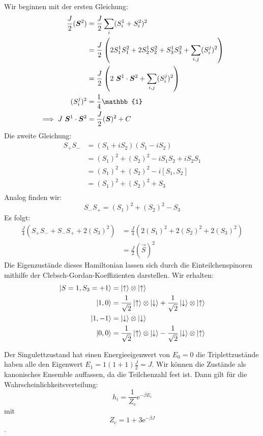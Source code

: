 Wir beginnen mit der ersten Gleichung:
\begin{align*}
\frac{J}{2}(\vec{S}^2) &= \frac{J}{2} \sum_i (S^1_i + S^2_i)^2 \\
&= \frac{J}{2} \del{2S^1_1S^2_1+2S^1_2S^2_2+S^1_3S^2_3 + \sum_{i,j} (S^j_i)^2} \\
&= \frac{J}{2} \del{2 \ \vec{S}^1 \cdot \vec{S}^2 + \sum_{i,j} (S^j_i)^2}  \\
(S^j_i)^2 &= \frac{1}{4} \mathbb{1} \\
\implies J \ \vec{S}^1 \cdot \vec{S}^2 &= \frac{J}{2}(\vec{S})^2 + C
\end{align*}
Die zweite Gleichung:
\begin{align*}
S_+S_- &= (S_1 + iS_2)(S_1 - iS_2)  \\
&= (S_1)^2 + (S_2)^2 - iS_1S_2 + iS_2S_1 \\
&= (S_1)^2 + (S_2)^2 - i[S_1,S_2] \\
&= (S_1)^2 + (S_2)^2 + S_3 \\
\end{align*}
Analog finden wir: 
\[ S_-S_+ = (S_1)^2 + (S_2)^2 - S_3 \]
Es folgt:
\begin{align*}
\frac{J}{4}(S_+S_-+S_-S_++2(S_3)^2) &= \frac{J}{4}(2(S_1)^2+2(S_2)^2+2(S_3)^2) \\
&= \frac{J}{2}(\vec{S})^2
\end{align*}
Die Eigenzustände dieses Hamiltonian lassen sich durch die Einteilchenspinoren mithilfe der Clebsch-Gordan-Koeffizienten darstellen. Wir erhalten:
\begin{align*}
\ket{S=1, S_3=+1} &= \ket{\uparrow} \otimes \ket{\uparrow} \\
\ket{1,0} &= \frac{1}{\sqrt{2}}\ket{\uparrow} \otimes \ket{\downarrow} + \frac{1}{\sqrt{2}} \ket{\downarrow} \otimes \ket{\uparrow} \\
\ket{1,-1} &= \ket{\downarrow} \otimes \ket{\downarrow} \\
\ket{0,0} &= \frac{1}{\sqrt{2}} \ket{\uparrow} \otimes \ket{\downarrow} - \frac{1}{\sqrt{2}} \ket{\downarrow} \otimes \ket{\uparrow}
\end{align*}

Der Singulettzustand hat einen Energieeigenwert von $E_0=0$ die Triplettzustände haben alle den Eigenwert $E_1=1(1+1)\frac{J}{2}=J$. Wir können die Zustände als kanonisches Ensemble auffassen, da die Teilchenzahl fest ist. Dann gilt für die Wahrscheinlichkeitsverteilung:
\[h_i=\frac{1}{Z_c} \mathrm{e}^{-\beta E_i} \]
mit \[Z_c=1+ 3\mathrm{e}^{-\beta J} \].

